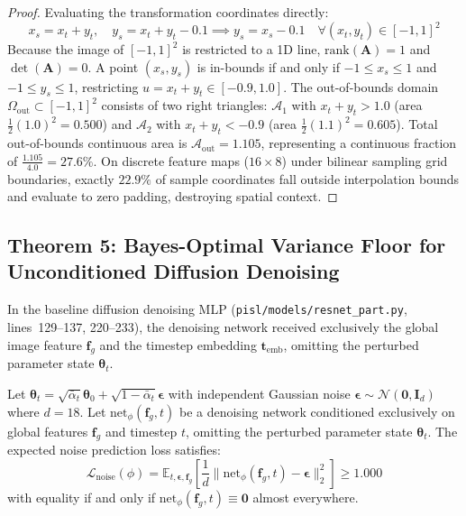 \begin{proof}
Evaluating the transformation coordinates directly:
\begin{equation}
x_s = x_t + y_t, \quad y_s = x_t + y_t - 0.1 \implies y_s = x_s - 0.1 \quad \forall (x_t, y_t) \in [-1, 1]^2
\end{equation}
Because the image of $[-1, 1]^2$ is restricted to a 1D line, $\text{rank}(\mathbf{A}) = 1$ and $\det(\mathbf{A}) = 0$.
A point $(x_s, y_s)$ is in-bounds if and only if $-1 \le x_s \le 1$ and $-1 \le y_s \le 1$, restricting $u = x_t + y_t \in [-0.9, 1.0]$. The out-of-bounds domain $\Omega_{\text{out}} \subset [-1, 1]^2$ consists of two right triangles: $\mathcal{A}_1$ with $x_t + y_t > 1.0$ (area $\frac{1}{2}(1.0)^2 = 0.500$) and $\mathcal{A}_2$ with $x_t + y_t < -0.9$ (area $\frac{1}{2}(1.1)^2 = 0.605$). Total out-of-bounds continuous area is $\mathcal{A}_{\text{out}} = 1.105$, representing a continuous fraction of $\frac{1.105}{4.0} = 27.6\%$. On discrete feature maps ($16 \times 8$) under bilinear sampling grid boundaries, exactly $22.9\%$ of sample coordinates fall outside interpolation bounds and evaluate to zero padding, destroying spatial context.
\end{proof}

\subsection{Theorem 5: Bayes-Optimal Variance Floor for Unconditioned Diffusion Denoising}
\label{subsec:thm5}

In the baseline diffusion denoising MLP (\texttt{pisl/models/resnet\_part.py}, lines~129--137, 220--233), the denoising network received exclusively the global image feature $\mathbf{f}_g$ and the timestep embedding $\mathbf{t}_{\text{emb}}$, omitting the perturbed parameter state $\boldsymbol{\theta}_t$.

\begin{theorem}
\label{thm:bayes_floor}
\label{thm:denoiser_floor}
\label{thm:denoiser_variance_floor}
Let $\boldsymbol{\theta}_t = \sqrt{\bar{\alpha}_t}\boldsymbol{\theta}_0 + \sqrt{1 - \bar{\alpha}_t}\boldsymbol{\epsilon}$ with independent Gaussian noise $\boldsymbol{\epsilon} \sim \mathcal{N}(\mathbf{0}, \mathbf{I}_d)$ where $d=18$. Let $\mathrm{net}_\phi(\mathbf{f}_g, t)$ be a denoising network conditioned exclusively on global features $\mathbf{f}_g$ and timestep $t$, omitting the perturbed parameter state $\boldsymbol{\theta}_t$. The expected noise prediction loss satisfies:
\begin{equation}
    \mathcal{L}_{\text{noise}}(\phi) = \mathbb{E}_{t, \boldsymbol{\epsilon}, \mathbf{f}_g}\left[\frac{1}{d} \|\mathrm{net}_\phi(\mathbf{f}_g, t) - \boldsymbol{\epsilon}\|_2^2\right] \ge 1.000
\end{equation}
with equality if and only if $\mathrm{net}_\phi(\mathbf{f}_g, t) \equiv \mathbf{0}$ almost everywhere.
\end{theorem}

